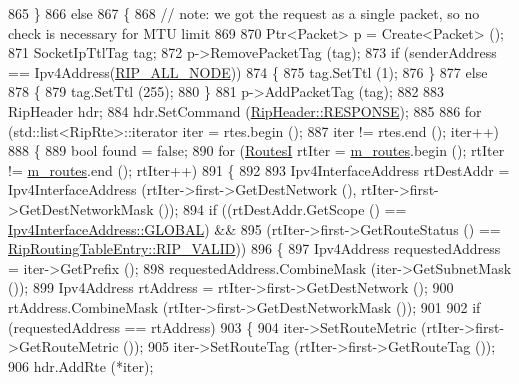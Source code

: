 \begin{DoxyCode}
865     \}
866   \textcolor{keywordflow}{else}
867     \{
868       \textcolor{comment}{// note: we got the request as a single packet, so no check is necessary for MTU limit}
869 
870       Ptr<Packet> p = Create<Packet> ();
871       SocketIpTtlTag tag;
872       p->RemovePacketTag (tag);
873       \textcolor{keywordflow}{if} (senderAddress == Ipv4Address(\hyperlink{rip_8cc_a4088e07a51c9aabba6666b6c1e85f704}{RIP\_ALL\_NODE}))
874         \{
875           tag.SetTtl (1);
876         \}
877       \textcolor{keywordflow}{else}
878         \{
879           tag.SetTtl (255);
880         \}
881       p->AddPacketTag (tag);
882 
883       RipHeader hdr;
884       hdr.SetCommand (\hyperlink{classns3_1_1RipHeader_a8c6ce779ee35c8b65446aaa202a6e789a9f13028e2d4a57da73f592702d7b17c7}{RipHeader::RESPONSE});
885 
886       \textcolor{keywordflow}{for} (std::list<RipRte>::iterator iter = rtes.begin ();
887           iter != rtes.end (); iter++)
888         \{
889           \textcolor{keywordtype}{bool} found = \textcolor{keyword}{false};
890           \textcolor{keywordflow}{for} (\hyperlink{classns3_1_1Rip_a8819af4dd44f270b6b19be755b39bce8}{RoutesI} rtIter = \hyperlink{classns3_1_1Rip_aea6c918ae311cd88fb2bfb714d6f9c30}{m\_routes}.begin (); rtIter != 
      \hyperlink{classns3_1_1Rip_aea6c918ae311cd88fb2bfb714d6f9c30}{m\_routes}.end (); rtIter++)
891             \{
892 
893               Ipv4InterfaceAddress rtDestAddr = Ipv4InterfaceAddress (rtIter->first->GetDestNetwork (), 
      rtIter->first->GetDestNetworkMask ());
894               \textcolor{keywordflow}{if} ((rtDestAddr.GetScope () == \hyperlink{classns3_1_1Ipv4InterfaceAddress_a329cea433e74f717c26c9e51c4fcd3d8ae144856017bcfb529872c91204d462b2}{Ipv4InterfaceAddress::GLOBAL}) &&
895                   (rtIter->first->GetRouteStatus () == 
      \hyperlink{classns3_1_1RipRoutingTableEntry_a4326145be5c3027f2ddf9eb80b6127a4ac29e62da26c18bf4b9caa5224cfee895}{RipRoutingTableEntry::RIP\_VALID}))
896                 \{
897                   Ipv4Address requestedAddress = iter->GetPrefix ();
898                   requestedAddress.CombineMask (iter->GetSubnetMask ());
899                   Ipv4Address rtAddress = rtIter->first->GetDestNetwork ();
900                   rtAddress.CombineMask (rtIter->first->GetDestNetworkMask ());
901 
902                   \textcolor{keywordflow}{if} (requestedAddress == rtAddress)
903                     \{
904                       iter->SetRouteMetric (rtIter->first->GetRouteMetric ());
905                       iter->SetRouteTag (rtIter->first->GetRouteTag ());
906                       hdr.AddRte (*iter);

\end{DoxyCode}
